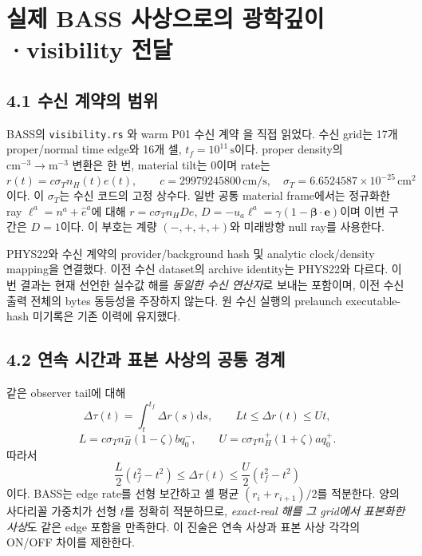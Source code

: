 \documentclass[11pt,a4paper]{article}
\newcommand{\dd}{\mathrm d}\newcommand{\HH}{\mathrm{HH}}\newcommand{\eV}{\mathrm{eV}}
\begin{document}
\newpage
\section{실제 BASS 사상으로의 광학깊이·visibility 전달}
\subsection*{4.1 수신 계약의 범위}
BASS의 \texttt{visibility.rs} \cite{basssource}와 warm P01 수신 계약 \cite{basscontract}을 직접 읽었다. 수신 grid는 17개 proper/normal time edge와 16개 셀, $t_f=10^{11}\,\mathrm s$이다. proper density의 $\mathrm{cm^{-3}}\to\mathrm{m^{-3}}$ 변환은 한 번, material tilt는 0이며 rate는
\begin{equation}
 r(t)=c\sigma_T n_H(t)e(t),\qquad
 c=29979245800\,\mathrm{cm/s},\quad\sigma_T=6.6524587\times10^{-25}\,\mathrm{cm^2}
\end{equation}
이다. 이 $\sigma_T$는 수신 코드의 고정 상수다. 일반 공통 material frame에서는 정규화한 ray $\ell^a=n^a+\hat e^a$에 대해 $r=c\sigma_Tn_HD e$, $D=-u_a\ell^a=\gamma(1-\boldsymbol\beta\cdot\boldsymbol e)$이며 이번 구간은 $D=1$이다. 이 부호는 계량 $(-,+,+,+)$와 미래방향 null ray를 사용한다.

PHYS22와 수신 계약의 provider/background hash 및 analytic clock/density mapping을 연결했다. 이전 수신 dataset의 archive identity는 PHYS22와 다르다. 이번 결과는 현재 선언한 실수값 해를 \emph{동일한 수신 연산자}로 보내는 포함이며, 이전 수신 출력 전체의 bytes 동등성을 주장하지 않는다. 원 수신 실행의 prelaunch executable-hash 미기록은 기존 이력에 유지했다.

\subsection*{4.2 연속 시간과 표본 사상의 공통 경계}
같은 observer tail에 대해
\begin{equation}
 \Delta\tau(t)=\int_t^{t_f}\Delta r(s)\dd s,\qquad
 Lt\le\Delta r(t)\le Ut,
\end{equation}
\begin{equation}
 L=c\sigma_Tn_H^-(1-\zeta)bq_0^-,\qquad
 U=c\sigma_Tn_H^+(1+\zeta)aq_0^+.
\end{equation}
따라서
\begin{equation}\boxed{
 \frac L2(t_f^2-t^2)\le\Delta\tau(t)\le\frac U2(t_f^2-t^2)
}\end{equation}
이다. BASS는 edge rate를 선형 보간하고 셀 평균 $(r_i+r_{i+1})/2$를 적분한다. 양의 사다리꼴 가중치가 선형 $t$를 정확히 적분하므로, \emph{exact-real 해를 그 grid에서 표본화한 사상}도 같은 edge 포함을 만족한다. 이 진술은 연속 사상과 표본 사상 각각의 ON/OFF 차이를 제한한다.
\end{document}
